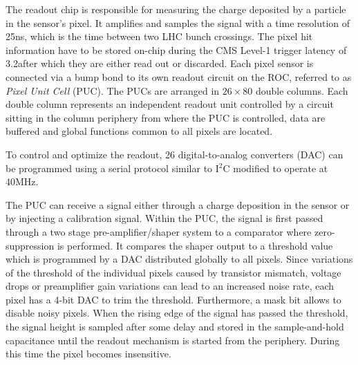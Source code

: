 The readout chip is responsible for measuring the charge deposited by a particle in the sensor's pixel.
It amplifies and samples the signal with a time resolution of 25\unit{ns}, which is the time between two LHC bunch crossings.
The pixel hit information have to be stored on-chip during the CMS Level-1 trigger latency of 3.2\mus after which they are either read out or discarded.
Each pixel sensor is connected via a bump bond to its own readout circuit on the ROC, referred to as \textit{Pixel Unit Cell} (PUC). 
The PUCs are arranged in $26\times80$ double columns. Each double column represents an independent readout unit controlled by a circuit sitting in the column periphery from where the PUC is controlled, data are buffered and global functions common to all pixels are located.

To control and optimize the readout, 26 digital-to-analog converters (DAC) can be programmed using a serial protocol similar to I$^2$C modified to operate at 40\unit{MHz}.

The PUC can receive a signal either through a charge deposition in the sensor or by injecting a calibration signal.
Within the PUC, the signal is first passed through a two stage pre-amplifier/shaper system to a comparator where zero-suppression is performed.
It compares the shaper output to a threshold value which is programmed by a DAC distributed globally to all pixels.
Since variations of the threshold of the individual pixels caused by transistor mismatch, voltage drops or preamplifier gain variations can lead to an increased noise rate,
each pixel has a 4-bit DAC to trim the threshold. Furthermore, a mask bit allows to disable noisy pixels.
When the rising edge of the signal has passed the threshold, the signal height is sampled after some delay and stored in the sample-and-hold capacitance until the readout mechanism is started from the periphery. During this time the pixel becomes insensitive.


